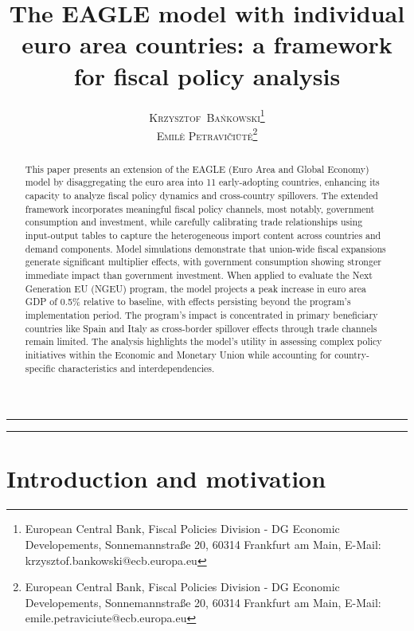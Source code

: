 \documentclass[paper=letter, fontsize=12pt]{article}
\title{\vspace{-15mm}\fontsize{24pt}{20pt}\selectfont\textbf{The EAGLE model with individual euro area countries: a framework for fiscal policy analysis}} %
\author{
\large
{\textsc{Krzysztof~Ba\'nkowski\footnote{European Central Bank, Fiscal Policies Division - DG Economic Developements, Sonnemannstraße 20, 60314 Frankfurt am Main, E-Mail: krzysztof.bankowski@ecb.europa.eu}}}\\[2mm]
{\textsc{Emilė Petravičiūtė\footnote{European Central Bank, Fiscal Policies Division - DG Economic Developements, Sonnemannstraße 20, 60314 Frankfurt am Main, E-Mail: emile.petraviciute@ecb.europa.eu}}}\\[2mm]
}
\date{}
\newcommand{\horrule}[1]{\rule{\linewidth}{#1}} %
\begin{document}
\maketitle %
\thispagestyle{fancy} %

\vspace{10mm}
\noindent\horrule{0.5pt} %
\begin{center}
\end{center}
\noindent\horrule{0.5pt} %
\vspace{4mm}

\begin{abstract}
    This paper presents an extension of the EAGLE (Euro Area and Global Economy) model by disaggregating the euro area into 11 early-adopting countries, enhancing its capacity to analyze fiscal policy dynamics and cross-country spillovers. The extended framework incorporates meaningful fiscal policy channels, most notably, government consumption and investment, while carefully calibrating trade relationships using input-output tables to capture the heterogeneous import content across countries and demand components. Model simulations demonstrate that union-wide fiscal expansions generate significant multiplier effects, with government consumption showing stronger immediate impact than government investment. When applied to evaluate the Next Generation EU (NGEU) program, the model projects a peak increase in euro area GDP of 0.5\% relative to baseline, with effects persisting beyond the program's implementation period. The program's impact is concentrated in primary beneficiary countries like Spain and Italy as cross-border spillover effects through trade channels remain limited. The analysis highlights the model's utility in assessing complex policy initiatives within the Economic and Monetary Union while accounting for country-specific characteristics and interdependencies.
\end{abstract}

\section*{Introduction and motivation}
\end{document}
